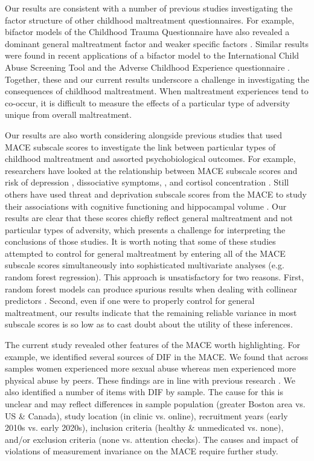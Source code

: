 \documentclass[letterpaper,man,natbib,noextraspace,floatsintext,longtable]{apa6}
\begin{document}
Our results are consistent with a number of previous studies investigating the factor structure of other childhood maltreatment questionnaires. For example, bifactor models of the Childhood Trauma Questionnaire have also revealed a dominant general maltreatment factor and weaker specific factors \citep{spinhoven2014childhood, stagaki2022mediating}. Similar results were found in recent applications of a bifactor model to the International Child Abuse Screening Tool \citep{meinck2021factor} and the Adverse Childhood Experience questionnaire \citep{dobson2021latent}. Together, these and our current results underscore a challenge in investigating the consequences of childhood maltreatment. When maltreatment experiences tend to co-occur, it is difficult to measure the effects of a particular type of adversity unique from overall maltreatment.  
 
Our results are also worth considering alongside previous studies that used MACE subscale scores to investigate the link between particular types of childhood maltreatment and assorted psychobiological outcomes. For example, researchers have looked at the relationship between MACE subscale scores and risk of depression \citep{gerke2018childhood}, dissociative symptoms, \citep{schalinski2015type}, and cortisol concentration \citep{schalinski2019early}. Still others have used threat and deprivation subscale scores from the MACE to study their associations with cognitive functioning \citep{schalinski2018defining} and hippocampal volume \citep{teicher2018differential}. Our results are clear that these scores chiefly reflect general maltreatment and not particular types of adversity, which presents a challenge for interpreting the conclusions of those studies. It is worth noting that some of these studies attempted to control for general maltreatment by entering all of the MACE subscale scores simultaneously into sophisticated multivariate analyses (e.g. random forest regression). This approach is unsatisfactory for two reasons. First, random forest models can produce spurious results when dealing with collinear predictors \citep{gregorutti2017correlation}. Second, even if one were to properly control for general maltreatment, our results indicate that the remaining reliable variance in most subscale scores is so low as to cast doubt about the utility of these inferences.

The current study revealed other features of the MACE worth highlighting. For example, we identified several sources of DIF in the MACE. We found that across samples women experienced more sexual abuse whereas men experienced more physical abuse by peers. These findings are in line with previous research \citep{radford2013prevalence}. We also identified a number of items with DIF by sample. The cause for this is unclear and may reflect differences in sample population (greater Boston area vs. US \& Canada), study location (in clinic vs. online), recruitment years (early 2010s vs. early 2020s), inclusion criteria (healthy \& unmedicated vs. none), and/or exclusion criteria (none vs. attention checks). The causes and impact of violations of measurement invariance on the MACE require further study. 
\end{document}
